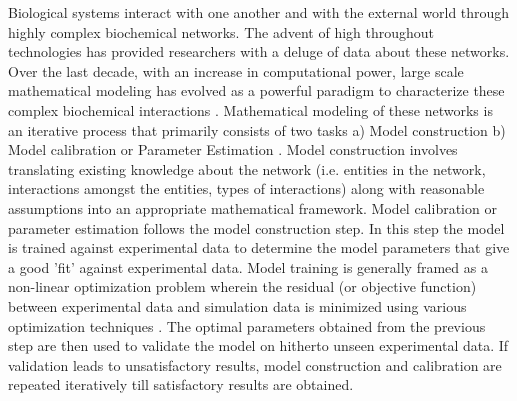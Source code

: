 \documentclass[12pt]{article}
\begin{document}
Biological systems interact with one another and with the external world through highly complex biochemical networks. The advent of high throughout technologies has provided researchers with a deluge of data about these networks. Over the last decade, with an increase in computational power, large scale mathematical modeling has evolved as a powerful paradigm to characterize these complex biochemical interactions \cite{assmus2006dynamics, Riel:2006aa,Jaqaman:2006aa,kitano2002systems,hood2004systems}. Mathematical modeling of these networks is an iterative process that primarily consists of two tasks a) Model construction b) Model calibration or Parameter Estimation \cite{Aldridge:2006aa}\cite{banga2008optimization} \cite{ashyraliyev2009systems}. Model construction involves translating existing knowledge about the network (i.e. entities in the network, interactions amongst the entities, types of interactions) along with reasonable assumptions into an appropriate mathematical framework. Model calibration or parameter estimation follows the model construction step.  In this step the model is trained against experimental data to determine the model parameters that give a good 'fit' against experimental data. Model training is generally framed as a non-linear optimization problem wherein the residual (or objective function) between experimental data and simulation data is minimized using various optimization techniques \cite{moles2003parameter}. The optimal parameters obtained from the previous step are then used to validate the model on hitherto unseen experimental data. If validation leads to unsatisfactory results, model construction and calibration are repeated iteratively till satisfactory results are obtained.  
\end{document}
